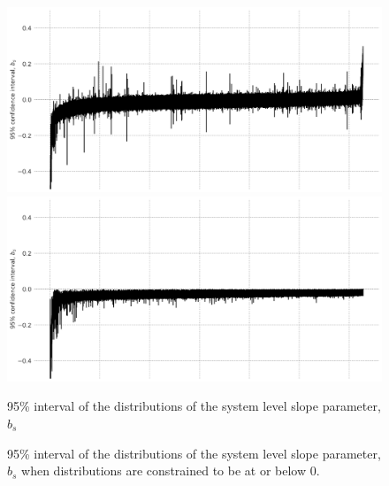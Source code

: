 \documentclass[a4paper]{article}
\begin{document}

\begin{figure}
\begin{minipage}{.45\textwidth}
  \centering
  \includegraphics[width=1\linewidth]{figures/Bay_bs.png}
 \end{minipage}\qquad
\begin{minipage}{.45\textwidth}
  \centering
  \includegraphics[width=1\linewidth]{figures/Bay_bs_const.png}
 \end{minipage}

\bigskip

\begin{minipage}[t]{.45\textwidth}
\centering
 \caption{95\% interval of the distributions of the system level slope parameter, $b_s$}
  \label{fig:Bay_bs}
\end{minipage}\qquad
\begin{minipage}[t]{.45\textwidth}
\centering
  \caption{95\% interval of the distributions of the system level slope parameter, $b_s$ when distributions are constrained to be at or below 0.}
   \label{fig:Bay_bs_const}
\end{minipage}
\end{figure}
\end{document}
